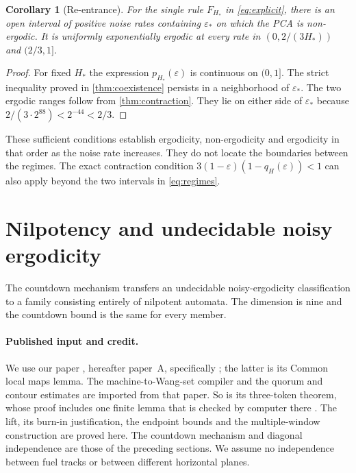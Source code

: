 \documentclass[11pt]{article}
\theoremstyle{plain}
\newtheorem{corollary}[theorem]{Corollary}
\theoremstyle{definition}
\theoremstyle{remark}
\newcommand{\eps}{\varepsilon}
\begin{document}
\begin{corollary}[Re-entrance]\label{cor:reentrance}
For the single rule $F_{H_*}$ in \eqref{eq:explicit}, there is an open interval of positive noise rates containing $\eps_*$ on which the PCA is non-ergodic. It is uniformly exponentially ergodic at every rate in $(0,2/(3H_*))$ and $(2/3,1]$.
\end{corollary}
\begin{proof}
For fixed $H_*$ the expression $p_{H_*}(\eps)$ is continuous on $(0,1]$. The strict inequality proved in \cref{thm:coexistence} persists in a neighborhood of $\eps_*$. The two ergodic ranges follow from \cref{thm:contraction}. They lie on either side of $\eps_*$ because $2/(3\cdot2^{88})<2^{-44}<2/3$.
\end{proof}

These sufficient conditions establish ergodicity, non-ergodicity and ergodicity in that order as the noise rate increases. They do not locate the boundaries between the regimes. The exact contraction condition $3(1-\eps)(1-q_H(\eps))<1$ can also apply beyond the two intervals in \eqref{eq:regimes}.

\section{Nilpotency and undecidable noisy ergodicity}\label{sec:nu-undecidable}

The countdown mechanism transfers an undecidable noisy-ergodicity classification to a family consisting entirely of nilpotent automata. The dimension is nine and the countdown bound is the same for every member.

\paragraph{Published input and credit.}
We use our paper \cite{DM26A}, hereafter paper~A, specifically \cite[Corollary~9.21 and Lemma~8.11]{DM26A}; the latter is its Common local maps lemma. The machine-to-Wang-set compiler and the quorum and contour estimates are imported from that paper. So is its three-token theorem, whose proof includes one finite lemma that is checked by computer there \cite[Lemma~9.12]{DM26A}. The lift, its burn-in justification, the endpoint bounds and the multiple-window construction are proved here. The countdown mechanism and diagonal independence are those of the preceding sections. We assume no independence between fuel tracks or between different horizontal planes.
\end{document}
